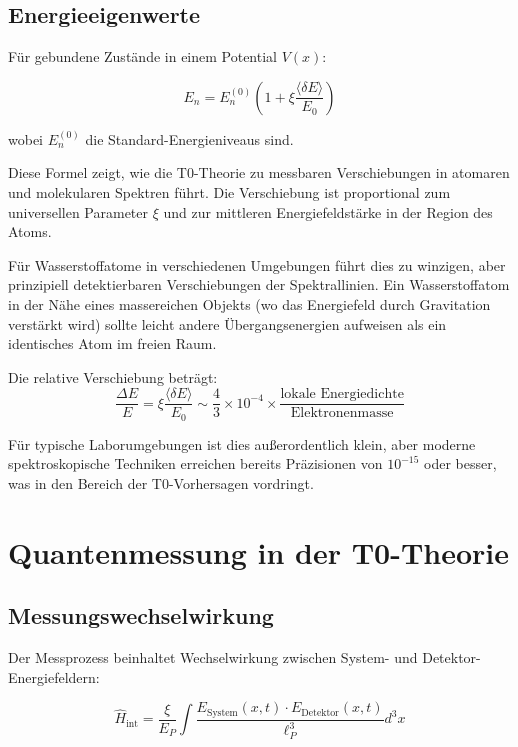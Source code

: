 \documentclass[12pt,a4paper]{article}
\newcommand{\deltaE}{\delta E}
\newcommand{\xipar}{\xi}
\newcommand{\EPlanck}{E_P}
\theoremstyle{definition}
\theoremstyle{remark}
\begin{document}
\subsection{Energieeigenwerte}

F{\"u}r gebundene Zust{\"a}nde in einem Potential $V(x)$:

\begin{equation}
	E_n = E_n^{(0)} \left(1 + \xipar \frac{\langle \deltaE \rangle}{E_0}\right)
	\label{eq:energy_shift}
\end{equation}

wobei $E_n^{(0)}$ die Standard-Energieniveaus sind.

Diese Formel zeigt, wie die T0-Theorie zu messbaren Verschiebungen in atomaren und molekularen Spektren f{\"u}hrt. Die Verschiebung ist proportional zum universellen Parameter $\xipar$ und zur mittleren Energiefeldst{\"a}rke in der Region des Atoms.

F{\"u}r Wasserstoffatome in verschiedenen Umgebungen f{\"u}hrt dies zu winzigen, aber prinzipiell detektierbaren Verschiebungen der Spektrallinien. Ein Wasserstoffatom in der N{\"a}he eines massereichen Objekts (wo das Energiefeld durch Gravitation verst{\"a}rkt wird) sollte leicht andere {\"U}bergangsenergien aufweisen als ein identisches Atom im freien Raum.

Die relative Verschiebung betr{\"a}gt:
$$\frac{\Delta E}{E} = \xipar \frac{\langle \deltaE \rangle}{E_0} \sim \frac{4}{3} \times 10^{-4} \times \frac{\text{lokale Energiedichte}}{\text{Elektronenmasse}}$$

F{\"u}r typische Laborumgebungen ist dies au{\ss}erordentlich klein, aber moderne spektroskopische Techniken erreichen bereits Pr{\"a}zisionen von $10^{-15}$ oder besser, was in den Bereich der T0-Vorhersagen vordringt.

\section{Quantenmessung in der T0-Theorie}

\subsection{Messungswechselwirkung}

Der Messprozess beinhaltet Wechselwirkung zwischen System- und Detektor-Energiefeldern:

\begin{equation}
	\hat{H}_{\text{int}} = \frac{\xipar}{\EPlanck} \int \frac{E_{\text{System}}(x,t) \cdot E_{\text{Detektor}}(x,t)}{\ell_P^3} d^3x
	\label{eq:measurement_interaction}
\end{equation}
\end{document}
